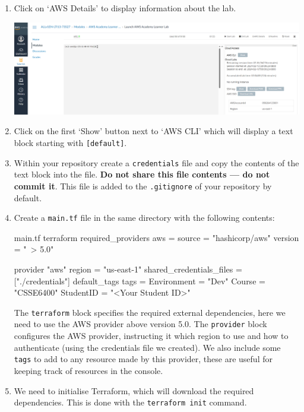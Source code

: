 \documentclass{csse4400}
\begin{document}
\begin{enumerate}
\item Click on `AWS Details' to display information about the lab.

\hspace{-4mm}
\includegraphics[width=\textwidth]{images/aws-details}

\item Click on the first `Show' button next to `AWS CLI' which will display a text block starting with \texttt{[default]}.
\item Within your repository create a \texttt{credentials} file and copy the contents of the text block into the file.
\textbf{Do not share this file contents --- do not commit it}.
This file is added to the \texttt{.gitignore} of your repository by default.
\item Create a \texttt{main.tf} file in the same directory with the following contents:
\begin{code}[language=terraform,numbers=none]{main.tf}
terraform {
    required_providers {
        aws = {
            source  = "hashicorp/aws"
            version = "~> 5.0"
        }
    }
}

provider "aws" {
    region = "us-east-1"
    shared_credentials_files = ["./credentials"]
    default_tags {
        tags = {
            Environment = "Dev"
            Course      = "CSSE6400"
            StudentID   = "<Your Student ID>"
        }
  }
}
\end{code}

The \texttt{terraform} block specifies the required external dependencies, here we need to use the AWS provider above version 5.0.
The \texttt{provider} block configures the AWS provider, instructing it which region to use and how to authenticate (using the credentials file we created).
We also include some \texttt{tags} to add to any resource made by this provider, these are useful for keeping track of resources in the console.

\item We need to initialise Terraform, which will download the required dependencies.
      This is done with the \texttt{terraform init} command.


\end{enumerate}
\end{document}
